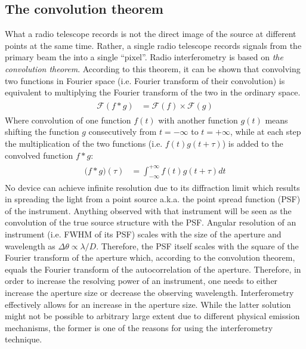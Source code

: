 \documentclass[a4wide,12pt]{book}
\begin{document}
{\subsection*{The convolution theorem}
What a radio telescope records is not the direct image of the source at different points at the same time. Rather, a single radio telescope records signals from the primary beam the into a single ``pixel''.  Radio interferometry is based on \emph{the convolution theorem}. According to this theorem, it can be shown that convolving two functions in Fourier space (i.e. Fourier transform of their convolution) is equivalent to multiplying the Fourier transform of the two in the ordinary space.
\begin{align} 
\begin{split}
\mathcal{F}(f*g) &= \mathcal{F}(f) \times \mathcal{F}(g)
\end{split}                    
\end{align}
Where convolution of one function $f(t)$ with another function $g(t)$ means shifting the function $g$ consecutively from $t=-\infty$ to $t=+\infty$, while at each step the multiplication of the two functions (i.e. $f(t)g(t+\tau)$) is added to the convolved function $f*g$:
\begin{align} 
\begin{split}
\mathcal (f*g)(\tau) &= \int_{-\infty}^{+\infty} f(t)g(t+\tau) dt
\end{split}                    
\end{align}
No device can achieve infinite resolution due to its diffraction limit which results in spreading the light from a point source a.k.a. the point spread function (PSF) of the instrument. Anything observed with that instrument will be seen as the convolution of the true source structure with the PSF. Angular resolution of an instrument (i.e. FWHM of its PSF) scales with the size of the aperture and wavelength as $\Delta\theta \propto \lambda / D$. Therefore, the PSF itself scales with the square of the Fourier transform of the aperture which, according to the convolution theorem, equals the Fourier transform of the autocorrelation of the aperture. Therefore, in order to increase the resolving power of an instrument, one needs to either increase the aperture size or decrease the observing wavelength.  Interferometry effectively allows for an increase in the aperture size. While the latter solution might not be possible to arbitrary large extent due to different physical emission mechanisms, the former is one of the reasons for using the interferometry technique.
 
}
\end{document}
